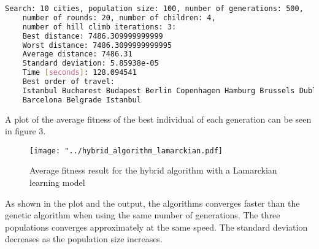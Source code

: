 \documentclass{article}
\begin{document}
\begin{lstlisting}[language=bash]
	Search: 10 cities, population size: 100, number of generations: 500, 
	number of rounds: 20, number of children: 4, 
	number of hill climb iterations: 3: 
	Best distance: 7486.309999999999
	Worst distance: 7486.3099999999995
	Average distance: 7486.31
	Standard deviation: 5.85938e-05
	Time [seconds]: 128.094541
	Best order of travel: 
	Istanbul Bucharest Budapest Berlin Copenhagen Hamburg Brussels Dublin 
	Barcelona Belgrade Istanbul
\end{lstlisting}
\noindent
A plot of the average fitness of the best individual of each generation can be seen in figure 3.
\begin{figure}[H]
\begin{center}
\texttt{[image: "../hybrid\_algorithm\_lamarckian.pdf]}
\caption{Average fitness result for the hybrid algorithm with a Lamarckian learning model}
\end{center}
\end{figure}
\noindent
As shown in the plot and the output, the algorithms converges faster than the genetic algorithm when using the same number of generations. The three populations converges approximately at the same speed. The standard deviation decreases as the population size increases.
\end{document}
